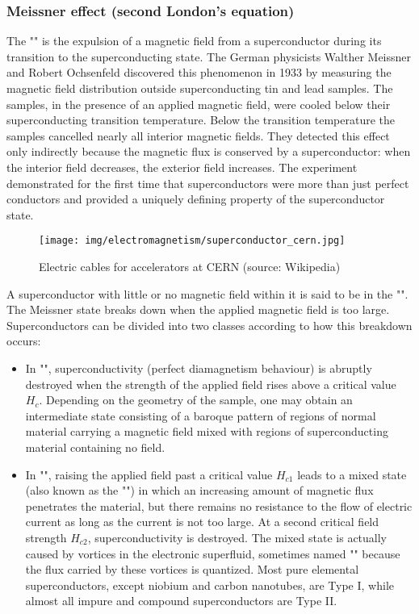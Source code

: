 	\subsubsection{Meissner effect (second London's equation)}
	The "" is the expulsion of a magnetic field from a superconductor during its transition to the superconducting state. The German physicists Walther Meissner and Robert Ochsenfeld discovered this phenomenon in 1933 by measuring the magnetic field distribution outside superconducting tin and lead samples. The samples, in the presence of an applied magnetic field, were cooled below their superconducting transition temperature. Below the transition temperature the samples cancelled nearly all interior magnetic fields. They detected this effect only indirectly because the magnetic flux is conserved by a superconductor: when the interior field decreases, the exterior field increases. The experiment demonstrated for the first time that superconductors were more than just perfect conductors and provided a uniquely defining property of the superconductor state.
	\begin{figure}[H]
		\centering
		\texttt{[image: img/electromagnetism/superconductor\_cern.jpg]}
		\caption[Electric cables for accelerators at CERN]{Electric cables for accelerators at CERN (source: Wikipedia)}
	\end{figure}
	A superconductor with little or no magnetic field within it is said to be in the "". The Meissner state breaks down when the applied magnetic field is too large. Superconductors can be divided into two classes according to how this breakdown occurs:
	\begin{itemize}
		\item In "", superconductivity (perfect diamagnetism behaviour) is abruptly destroyed when the strength of the applied field rises above a critical value $H_c$. Depending on the geometry of the sample, one may obtain an intermediate state consisting of a baroque pattern of regions of normal material carrying a magnetic field mixed with regions of superconducting material containing no field. 
		
		\item In "", raising the applied field past a critical value $H_{c1}$ leads to a mixed state (also known as the "") in which an increasing amount of magnetic flux penetrates the material, but there remains no resistance to the flow of electric current as long as the current is not too large. At a second critical field strength $H_{c2}$, superconductivity is destroyed. The mixed state is actually caused by vortices in the electronic superfluid, sometimes named "" because the flux carried by these vortices is quantized. Most pure elemental superconductors, except niobium and carbon nanotubes, are Type I, while almost all impure and compound superconductors are Type II.
	\end{itemize}
	
